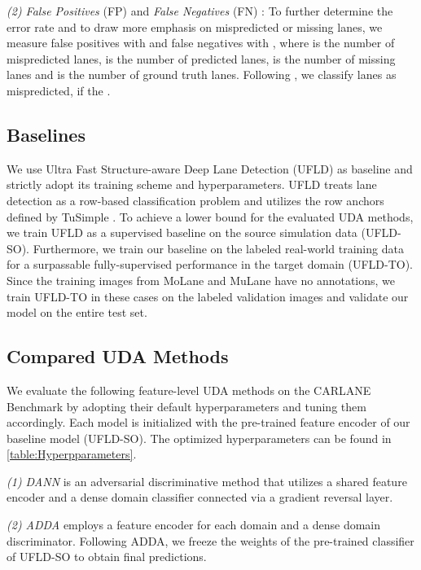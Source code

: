 \documentclass{article}
\begin{document}
	\textit{(2) False Positives} (FP) and \textit{False Negatives} (FN) \cite{qin2020ultra}: To further determine the error rate and to draw more emphasis on mispredicted or missing lanes, we measure false positives with  and false negatives with , where  is the number of mispredicted lanes,  is the number of predicted lanes,  is the number of missing lanes and  is the number of ground truth lanes. Following \cite{qin2020ultra}, we classify lanes as mispredicted, if the . 
	
	\subsection{Baselines}
	We use Ultra Fast Structure-aware Deep Lane Detection (UFLD) \cite{qin2020ultra} as baseline and strictly adopt its training scheme and hyperparameters. UFLD treats lane detection as a row-based classification problem and utilizes the row anchors defined by TuSimple \cite{TuSimple2017}.
	To achieve a lower bound for the evaluated UDA methods, we train UFLD as a supervised baseline on the source simulation data (UFLD-SO). Furthermore, we train our baseline on the labeled real-world training data for a surpassable fully-supervised performance in the target domain (UFLD-TO). Since the training images from MoLane and MuLane have no annotations, we train UFLD-TO in these cases on the labeled validation images and validate our model on the entire test set.
	
	\subsection{Compared UDA Methods}
	We evaluate the following feature-level UDA methods on the CARLANE Benchmark by adopting their default hyperparameters and tuning them accordingly. Each model is initialized with the pre-trained feature encoder of our baseline model (UFLD-SO). The optimized hyperparameters can be found in \autoref{table:Hyperpparameters}. \vspace{-2pt}
	
	\textit{(1) DANN} \cite{Ganin2016} is an adversarial discriminative method that utilizes a shared feature encoder and a dense domain classifier connected via a gradient reversal layer.
	\vspace{-2pt}
	
	\textit{(2) ADDA} \cite{Tzeng2017ADDA} employs a feature encoder for each domain and a dense domain discriminator. Following ADDA, we freeze the weights of the pre-trained classifier of UFLD-SO to obtain final predictions.
	
\end{document}
